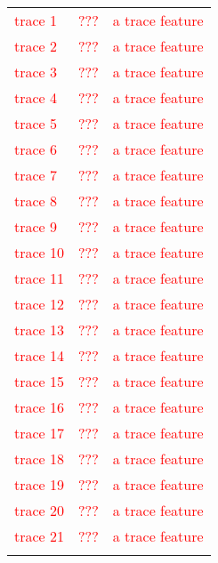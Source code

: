 \documentclass[10pt]{article}
\newcommand{\todo}[1]{\textcolor{red}{#1}}
\begin{document}
\begin{table}[h]
\begin{tabular}{lll}
    \todo{trace 1} & \todo{???} &  \todo{a trace feature} \\
    \addlinespace[2pt]
    \todo{trace 2} & \todo{???} &  \todo{a trace feature} \\
    \addlinespace[2pt]
    \todo{trace 3} & \todo{???} &  \todo{a trace feature} \\
    \addlinespace[2pt]
    \todo{trace 4} & \todo{???} &  \todo{a trace feature} \\
    \addlinespace[2pt]
    \todo{trace 5} & \todo{???} &  \todo{a trace feature} \\
    \addlinespace[2pt]
    \todo{trace 6} & \todo{???} &  \todo{a trace feature} \\
    \addlinespace[2pt]
    \todo{trace 7} & \todo{???} &  \todo{a trace feature} \\
    \addlinespace[2pt]
    \todo{trace 8} & \todo{???} &  \todo{a trace feature} \\
    \addlinespace[2pt]
    \todo{trace 9} & \todo{???} &  \todo{a trace feature} \\
    \addlinespace[2pt]
    \todo{trace 10} & \todo{???} &  \todo{a trace feature} \\
    \addlinespace[2pt]
    \todo{trace 11} & \todo{???} &  \todo{a trace feature} \\
    \addlinespace[2pt]
    \todo{trace 12} & \todo{???} &  \todo{a trace feature} \\
    \addlinespace[2pt]
    \todo{trace 13} & \todo{???} &  \todo{a trace feature} \\
    \addlinespace[2pt]
    \todo{trace 14} & \todo{???} &  \todo{a trace feature} \\
    \addlinespace[2pt]
    \todo{trace 15} & \todo{???} &  \todo{a trace feature} \\
    \addlinespace[2pt]
    \todo{trace 16} & \todo{???} &  \todo{a trace feature} \\
    \addlinespace[2pt]
    \todo{trace 17} & \todo{???} &  \todo{a trace feature} \\
    \addlinespace[2pt]
    \todo{trace 18} & \todo{???} &  \todo{a trace feature} \\
    \addlinespace[2pt]
    \todo{trace 19} & \todo{???} &  \todo{a trace feature} \\
    \addlinespace[2pt]
    \todo{trace 20} & \todo{???} &  \todo{a trace feature} \\
    \addlinespace[2pt]
    \todo{trace 21} & \todo{???} &  \todo{a trace feature} \\
    \addlinespace[2pt]

\end{tabular}
\end{table}
\end{document}

